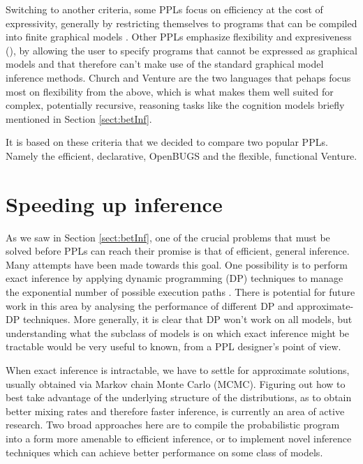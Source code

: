 Switching to another criteria, some PPLs focus on efficiency at the cost of expressivity, generally by restricting themselves to programs that can be compiled into finite graphical models \cite{lunn2009bugs, richardson2006markov, mccallum2009factorie, stan-software:2014, minkainfer}. Other PPLs emphasize flexibility and expresiveness (\cite{milch20071, pfeffer2001ibal, pfeffer2009figaro, goodman2008church}), by allowing the user to specify programs that cannot be expressed as graphical models and that therefore can't make use of the standard graphical model inference methods. Church and Venture are the two languages that pehaps focus most on flexibility from the above, which is what makes them well suited for complex, potentially recursive, reasoning tasks like the cognition models briefly mentioned in Section \ref{sect:betInf}.

It is based on these criteria that we decided to compare two popular PPLs. Namely the efficient, declarative, OpenBUGS and the flexible, functional Venture.

\section{Speeding up inference}

As we saw in Section \ref{sect:betInf}, one of the crucial problems that must be solved before PPLs can reach their promise is that of efficient, general inference. Many attempts have been made towards this goal. One possibility is to perform exact inference by applying dynamic programming (DP) techniques to manage the exponential number of possible execution paths \cite{stuhlmuller2012dynamic}. There is potential for future work in this area by analysing the performance of different DP and approximate-DP techniques. More generally, it is clear that DP won’t work on all models, but understanding what the subclass of models is on which exact inference might be tractable would be very useful to known, from a PPL designer's point of view.

When exact inference is intractable, we have to settle for approximate solutions, usually obtained via Markov chain Monte Carlo (MCMC). Figuring out how to best take advantage of the underlying structure
of the distributions, as to obtain better mixing rates and therefore faster inference, is currently an area of active research. Two broad approaches here are to compile the probabilistic program into a form more amenable to efficient inference, or to implement novel inference techniques which can achieve better performance on some class of models.

